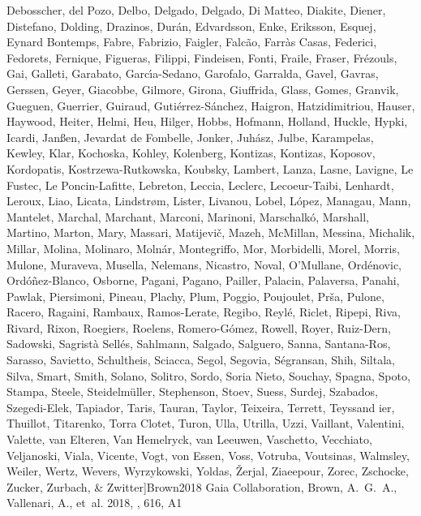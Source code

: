 \documentclass[longauth]{aa} %
\begin{document}
\begin{thebibliography}{112}
{		{Debosscher}, {del Pozo}, {Delbo}, {Delgado}, {Delgado}, {Di Matteo},
		{Diakite}, {Diener}, {Distefano}, {Dolding}, {Drazinos}, {Dur{\'a}n},
		{Edvardsson}, {Enke}, {Eriksson}, {Esquej}, {Eynard Bontemps}, {Fabre},
		{Fabrizio}, {Faigler}, {Falc{\~a}o}, {Farr{\`a}s Casas}, {Federici},
		{Fedorets}, {Fernique}, {Figueras}, {Filippi}, {Findeisen}, {Fonti},
		{Fraile}, {Fraser}, {Fr{\'e}zouls}, {Gai}, {Galleti}, {Garabato},
		{Garc{\'\i}a-Sedano}, {Garofalo}, {Garralda}, {Gavel}, {Gavras}, {Gerssen},
		{Geyer}, {Giacobbe}, {Gilmore}, {Girona}, {Giuffrida}, {Glass}, {Gomes},
		{Granvik}, {Gueguen}, {Guerrier}, {Guiraud}, {Guti{\'e}rrez-S{\'a}nchez},
		{Haigron}, {Hatzidimitriou}, {Hauser}, {Haywood}, {Heiter}, {Helmi}, {Heu},
		{Hilger}, {Hobbs}, {Hofmann}, {Holland}, {Huckle}, {Hypki}, {Icardi},
		{Jan{\ss}en}, {Jevardat de Fombelle}, {Jonker}, {Juh{\'a}sz}, {Julbe},
		{Karampelas}, {Kewley}, {Klar}, {Kochoska}, {Kohley}, {Kolenberg},
		{Kontizas}, {Kontizas}, {Koposov}, {Kordopatis}, {Kostrzewa-Rutkowska},
		{Koubsky}, {Lambert}, {Lanza}, {Lasne}, {Lavigne}, {Le Fustec}, {Le
			Poncin-Lafitte}, {Lebreton}, {Leccia}, {Leclerc}, {Lecoeur-Taibi},
		{Lenhardt}, {Leroux}, {Liao}, {Licata}, {Lindstr{\o}m}, {Lister}, {Livanou},
		{Lobel}, {L{\'o}pez}, {Managau}, {Mann}, {Mantelet}, {Marchal}, {Marchant},
		{Marconi}, {Marinoni}, {Marschalk{\'o}}, {Marshall}, {Martino}, {Marton},
		{Mary}, {Massari}, {Matijevi{\v{c}}}, {Mazeh}, {McMillan}, {Messina},
		{Michalik}, {Millar}, {Molina}, {Molinaro}, {Moln{\'a}r}, {Montegriffo},
		{Mor}, {Morbidelli}, {Morel}, {Morris}, {Mulone}, {Muraveva}, {Musella},
		{Nelemans}, {Nicastro}, {Noval}, {O'Mullane}, {Ord{\'e}novic},
		{Ord{\'o}{\~n}ez-Blanco}, {Osborne}, {Pagani}, {Pagano}, {Pailler},
		{Palacin}, {Palaversa}, {Panahi}, {Pawlak}, {Piersimoni}, {Pineau}, {Plachy},
		{Plum}, {Poggio}, {Poujoulet}, {Pr{\v{s}}a}, {Pulone}, {Racero}, {Ragaini},
		{Rambaux}, {Ramos-Lerate}, {Regibo}, {Reyl{\'e}}, {Riclet}, {Ripepi}, {Riva},
		{Rivard}, {Rixon}, {Roegiers}, {Roelens}, {Romero-G{\'o}mez}, {Rowell},
		{Royer}, {Ruiz-Dern}, {Sadowski}, {Sagrist{\`a} Sell{\'e}s}, {Sahlmann},
		{Salgado}, {Salguero}, {Sanna}, {Santana-Ros}, {Sarasso}, {Savietto},
		{Schultheis}, {Sciacca}, {Segol}, {Segovia}, {S{\'e}gransan}, {Shih},
		{Siltala}, {Silva}, {Smart}, {Smith}, {Solano}, {Solitro}, {Sordo}, {Soria
			Nieto}, {Souchay}, {Spagna}, {Spoto}, {Stampa}, {Steele},
		{Steidelm{\"u}ller}, {Stephenson}, {Stoev}, {Suess}, {Surdej}, {Szabados},
		{Szegedi-Elek}, {Tapiador}, {Taris}, {Tauran}, {Taylor}, {Teixeira},
		{Terrett}, {Teyssand ier}, {Thuillot}, {Titarenko}, {Torra Clotet}, {Turon},
		{Ulla}, {Utrilla}, {Uzzi}, {Vaillant}, {Valentini}, {Valette}, {van Elteren},
		{Van Hemelryck}, {van Leeuwen}, {Vaschetto}, {Vecchiato}, {Veljanoski},
		{Viala}, {Vicente}, {Vogt}, {von Essen}, {Voss}, {Votruba}, {Voutsinas},
		{Walmsley}, {Weiler}, {Wertz}, {Wevers}, {Wyrzykowski}, {Yoldas},
		{{\v{Z}}erjal}, {Ziaeepour}, {Zorec}, {Zschocke}, {Zucker}, {Zurbach}, \&
		{Zwitter}}]{Brown2018}
	{Gaia Collaboration}, {Brown}, A.~G.~A., {Vallenari}, A., {et~al.}
	2018{}, \aap, 616, A1
	

\end{thebibliography}
\end{document}
